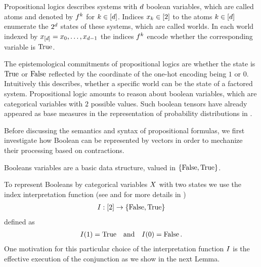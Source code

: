 \chapter{\chatextlogicalRepresentation}\label{cha:logicalRepresentation}

Propositional logics describes systems with $d$ boolean variables, which are called atoms and denoted by $f^{k}$ for $k\in[d]$.
Indices $x_{k}\in[2]$ to the atoms $k\in[d]$ enumerate the $2^d$ states of these systems, which are called worlds.
In each world indexed by $x_{[d]}=x_{0},\ldots,x_{d-1}$ the indices $f^{k}$ encode whether the corresponding variable is $\mathrm{True}$.

The epistemological commitments of propositional logics are whether the state is $\mathrm{True}$ or $\mathrm{False}$ reflected by the coordinate of the one-hot encoding being $1$ or $0$.
Intuitively this describes, whether a specific world can be the state of a factored system.
Propositional logic amounts to reason about boolean variables, which are categorical variables with $2$ possible values.
Such boolean tensors have already appeared as base measures in the representation of probability distributions in .

Before discussing the semantics and syntax of propositional formulas, we first investigate how Boolean can be represented by vectors in order to mechanize their processing based on contractions.



\label{sec:booleanEncoding}

Booleans variables are a basic data structure, valued in $\{\mathrm{False},\mathrm{True}\}$.


To represent Booleans by categorical variables $X$ with two states we use the index interpretation function (see  and for more details  in )
\begin{align*}
    \indexinterpretation:[2]\rightarrow\truthset%
\end{align*}
defined as
\begin{align*}
    \indexinterpretationat{1} = \truesymbol%
    \quad \text{and} \quad \indexinterpretationat{0} = \falsesymbol \, .
\end{align*}
One motivation for this particular choice of the interpretation function $I$ is the effective execution of the conjunction as we show in the next Lemma.

